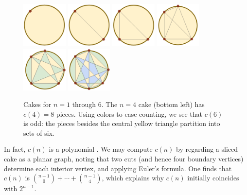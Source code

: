 \documentclass[twocolumn, 11pt]{article}
\theoremstyle{definition}
\begin{document}
        \begin{figure}[H]
            \centering
            \includegraphics[height=2.3cm]{cake-1}
            \includegraphics[height=2.3cm]{cake-2}
            \includegraphics[height=2.3cm]{cake-3}
            \includegraphics[height=2.3cm]{cake-4}
            \includegraphics[height=2.3cm]{cake-5-col}
            \includegraphics[height=2.3cm]{cake-6-col}
            \caption{{
                Cakes for $n=1$ through $6$.
                The $n=4$ cake (bottom left) has $c(4)=8$ pieces.
                Using colors to ease counting,
                we see that $c(6)$ is odd: the pieces besides the
                central yellow triangle partition into sets of six.
            }}
        \end{figure}

        In fact, $c(n)$ is a polynomial \cite{wetzel}.  We may compute $c(n)$
        by regarding a sliced cake as a planar graph, noting that two cuts (and
        hence four boundary vertices) determine each interior vertex, and
        applying Euler's formula.  One finds that $c(n)$ is ${n-1 \choose
        0}+\cdots+{n-1\choose 4}$, which explains why $c(n)$ initially
        coincides with $2^{n-1}$.
\end{document}
